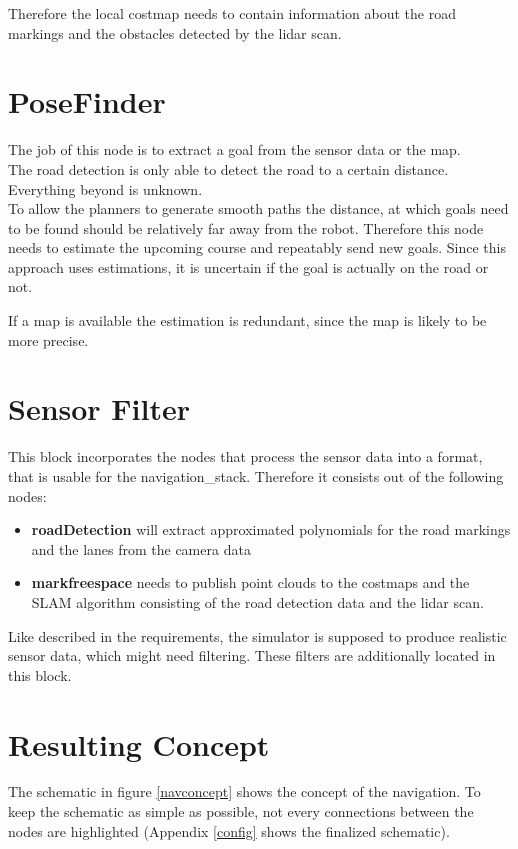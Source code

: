 Therefore the local costmap needs to contain information about the road markings and the obstacles detected by the lidar scan.

\section{PoseFinder}
The job of this node is to extract a goal from the sensor data or the map.\\

The road detection is only able to detect the road to a certain distance. Everything beyond is unknown.\\
To allow the planners to generate smooth paths the distance, at which goals need to be found should be relatively far away from the robot. Therefore this node needs to estimate the upcoming course and repeatably send new goals. Since this approach uses estimations, it is uncertain if the goal is actually on the road or not.

If a map is available the estimation is redundant, since the map is likely to be more precise.

\section{Sensor Filter}

This block incorporates the nodes that process the sensor data into a format, that is usable for the navigation\_stack. 
Therefore it consists out of the following nodes:

\begin{itemize}
	\item \textbf{roadDetection} will extract approximated polynomials for the road markings and the lanes from the camera data
	\item \textbf{markfreespace} needs to publish point clouds to the costmaps and the SLAM algorithm consisting of the road detection data and the lidar scan.
\end{itemize}

Like described in the requirements, the simulator is supposed to produce realistic sensor data, which might need filtering. These filters are additionally located in this block.

\section{Resulting Concept}
The schematic in figure \ref{navconcept} shows the concept of the navigation.  To keep the schematic as simple as possible, not every connections between the nodes are highlighted (Appendix \ref{config} shows the finalized schematic).\\

